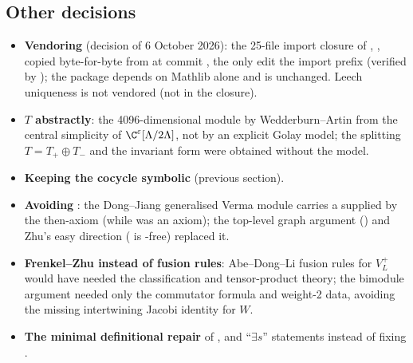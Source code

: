\subsection{Other decisions}
\begin{itemize}
\item \textbf{Vendoring } (decision of 6 October 2026): the 25-file import
  closure of , ,  copied
  byte-for-byte from  at commit
  , the only edit the import prefix (verified by
  ); the package depends on Mathlib alone and  is unchanged. Leech
  uniqueness is not vendored (not in the closure).
\item \textbf{$T$ abstractly}: the 4096-dimensional module by Wedderburn--Artin from the central
  simplicity of $\C^\varepsilon[\Lambda/2\Lambda]$, not by an explicit Golay model; the splitting
  $T=T_+\oplus T_-$ and the invariant form were obtained without the model.
\item \textbf{Keeping the cocycle symbolic} (previous section).
\item \textbf{Avoiding }: the Dong--Jiang generalised Verma module carries a
   supplied by the then-axiom (while  was an axiom); the top-level graph argument
  () and Zhu's easy direction ( is -free) replaced it.
\item \textbf{Frenkel--Zhu instead of fusion rules}: Abe--Dong--Li fusion rules for $V_L^+$ would
  have needed the classification and tensor-product theory; the bimodule argument needed only the
  commutator formula and weight-2 data, avoiding the missing intertwining Jacobi identity for $W$.
\item \textbf{The minimal definitional repair} of , and ``$\exists s$'' statements
  instead of fixing .
\end{itemize}

